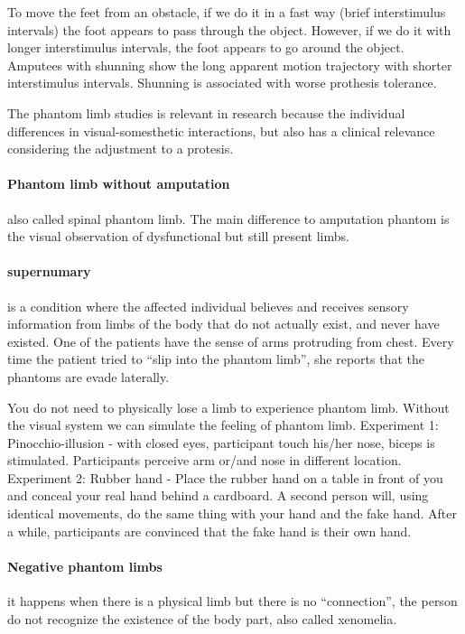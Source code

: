 \documentclass[12pt,article,oneside,a4paper]{memoir}
\begin{document}
To move the feet from an obstacle, if we do it in a fast way (brief interstimulus intervals) the foot appears to pass through the object. However, if we do it with longer interstimulus intervals, the foot appears to go around the object.
Amputees with shunning show the long apparent motion trajectory with shorter interstimulus intervals. Shunning is associated with worse prothesis tolerance.

The phantom limb studies is relevant in research because the individual differences in visual-somesthetic interactions, but also has a clinical relevance considering the adjustment to a protesis.

\paragraph{Phantom limb without amputation} also called spinal phantom limb. The main difference to amputation phantom is the visual observation of dysfunctional but still present limbs. 

\paragraph{supernumary} is a condition where the affected individual believes and receives sensory information from limbs of the body that do not actually exist, and never have existed. One of the patients have the sense of arms protruding from chest. Every time the patient tried to ``slip into the phantom limb'', she reports that the phantoms are evade laterally.

You do not need to physically lose a limb to experience phantom limb. Without the visual system we can simulate the feeling of phantom limb. 
Experiment 1: Pinocchio-illusion - with closed eyes, participant touch his/her nose, biceps is stimulated. Participants perceive arm or/and nose in different location.
Experiment 2: Rubber hand - Place the rubber hand on a table in front of you and conceal your real hand behind a cardboard. A second person will, using identical movements, do the same thing with your hand and the fake hand. After a while, participants are convinced that the fake hand is their own hand.

\paragraph{Negative phantom limbs} it happens when there is a physical limb but there is no ``connection'', the person do not recognize the existence of the body part, also called xenomelia.
\end{document}
